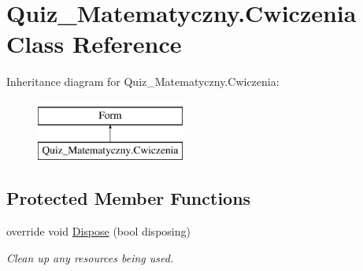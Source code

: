 \hypertarget{class_quiz___matematyczny_1_1_cwiczenia}{}\section{Quiz\+\_\+\+Matematyczny.\+Cwiczenia Class Reference}
\label{class_quiz___matematyczny_1_1_cwiczenia}
Inheritance diagram for Quiz\+\_\+\+Matematyczny.\+Cwiczenia\+:\begin{figure}[H]
\begin{center}
\leavevmode
\includegraphics[height=2.000000cm]{class_quiz___matematyczny_1_1_cwiczenia}
\end{center}
\end{figure}
\subsection*{Protected Member Functions}
\begin{DoxyCompactItemize}
\item 
override void \mbox{\hyperlink{class_quiz___matematyczny_1_1_cwiczenia_a243ec50b38a642ad320a8aa0a1758303}{Dispose}} (bool disposing)
\begin{DoxyCompactList}\small\item\em Clean up any resources being used. \end{DoxyCompactList}\end{DoxyCompactItemize}
